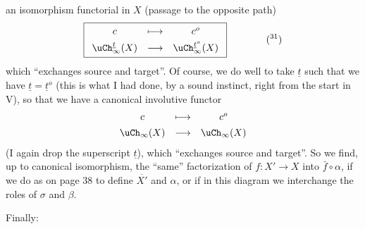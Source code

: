 an isomorphism functorial in $X$ (passage to the opposite path)
\[
\boxed{\begin{array}{ccc}
c & \longmapsto & c^o\\[4pt]
\uCh^{\underline{t}}_\infty(X) & \longrightarrow & \uCh^{\underline{t}^o}_\infty(X)
\end{array}}
\qquad\qquad
\text{(\footnotemark[31])}
\]
which ``exchanges source and target''. Of course, we do well to take $\underline{t}$ such that we have $\underline{t}=\underline{t}^o$ (this is what I had done, by a sound instinct, right from the start in V), so that we have a canonical involutive functor
\[
\begin{array}{ccc}
c & \longmapsto & c^o\\[4pt]
\uCh_\infty(X) & \longrightarrow & \uCh_\infty(X)
\end{array}
\]
(I again drop the superscript $\underline{t}$), which ``exchanges source and target''. So we find, up to canonical isomorphism, the ``same'' factorization of $f:X'\longrightarrow X$ into $\bar{f}\circ\alpha$, if we do as on page 38 to define $\overline{X'}$ and $\alpha$, or if in this diagram we interchange the roles of $\sigma$ and $\beta$. %

Finally:

